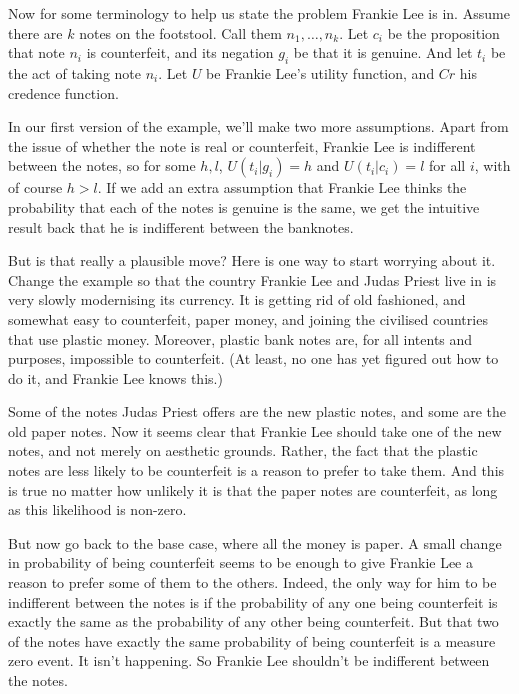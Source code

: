 \documentclass[
  11pt,
  letterpaper,
  DIV=11,
  numbers=noendperiod,
  oneside]{scrartcl}
\begin{document}
Now for some terminology to help us state the problem Frankie Lee is in.
Assume there are \(k\) notes on the footstool. Call them
\(n_1, \dots, n_k\). Let \(c_i\) be the proposition that note \(n_i\) is
counterfeit, and its negation \(g_i\) be that it is genuine. And let
\(t_i\) be the act of taking note \(n_i\). Let \(U\) be Frankie Lee's
utility function, and \(Cr\) his credence function.

In our first version of the example, we'll make two more assumptions.
Apart from the issue of whether the note is real or counterfeit, Frankie
Lee is indifferent between the notes, so for some \(h, l\),
\(U(t_i | g_i) = h\) and \(U(t_i | c_i) = l\) for all \(i\), with of
course \(h > l\). If we add an extra assumption that Frankie Lee thinks
the probability that each of the notes is genuine is the same, we get
the intuitive result back that he is indifferent between the banknotes.

But is that really a plausible move? Here is one way to start worrying
about it. Change the example so that the country Frankie Lee and Judas
Priest live in is very slowly modernising its currency. It is getting
rid of old fashioned, and somewhat easy to counterfeit, paper money, and
joining the civilised countries that use plastic money. Moreover,
plastic bank notes are, for all intents and purposes, impossible to
counterfeit. (At least, no one has yet figured out how to do it, and
Frankie Lee knows this.)

Some of the notes Judas Priest offers are the new plastic notes, and
some are the old paper notes. Now it seems clear that Frankie Lee should
take one of the new notes, and not merely on aesthetic grounds. Rather,
the fact that the plastic notes are less likely to be counterfeit is a
reason to prefer to take them. And this is true no matter how unlikely
it is that the paper notes are counterfeit, as long as this likelihood
is non-zero.

But now go back to the base case, where all the money is paper. A small
change in probability of being counterfeit seems to be enough to give
Frankie Lee a reason to prefer some of them to the others. Indeed, the
only way for him to be indifferent between the notes is if the
probability of any one being counterfeit is exactly the same as the
probability of any other being counterfeit. But that two of the notes
have exactly the same probability of being counterfeit is a measure zero
event. It isn't happening. So Frankie Lee shouldn't be indifferent
between the notes.
\end{document}
